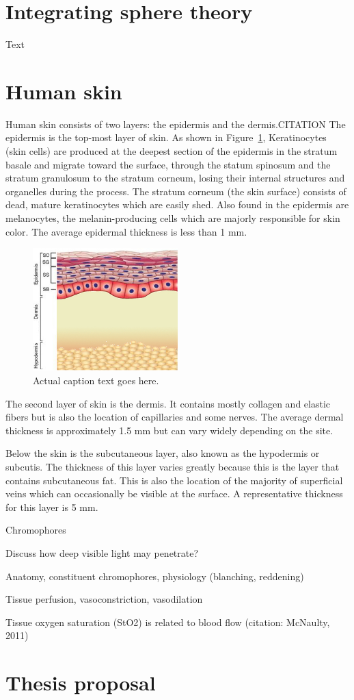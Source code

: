 \section{Integrating sphere theory}
\label{sec:is_theory}
Text

\section{Human skin}
Human skin consists of two layers: the epidermis and the dermis.CITATION The epidermis is the top-most layer of skin. As shown in Figure~\ref{fig:intro-skin_layers}, Keratinocytes (skin cells) are produced at the deepest section of the epidermis in the stratum basale and migrate toward the surface, through the statum spinosum and the stratum granulosum to the stratum corneum, losing their internal structures and organelles during the process. The stratum corneum (the skin surface) consists of dead, mature keratinocytes which are easily shed. Also found in the epidermis are melanocytes, the melanin-producing cells which are majorly responsible for skin color. The average epidermal thickness is less than 1 mm.\cite{Huclova2012}

\begin{figure}
	\centering \includegraphics[width=0.5\textwidth]{figures/intro-skin_layers.jpg}
	\caption[Hover text]{\label{fig:intro-skin_layers}Actual caption text goes here.}
\end{figure}

The second layer of skin is the dermis. It contains mostly collagen and elastic fibers but is also the location of capillaries and some nerves. The average dermal thickness is approximately 1.5 mm but can vary widely depending on the site.

Below the skin is the subcutaneous layer, also known as the hypodermis or subcutis. The thickness of this layer varies greatly because this is the layer that contains subcutaneous fat. This is also the location of the majority of superficial veins which can occasionally be visible at the surface. A representative thickness for this layer is 5 mm.

Chromophores

Discuss how deep visible light may penetrate?

Anatomy, constituent chromophores, physiology (blanching, reddening)

Tissue perfusion, vasoconstriction, vasodilation

Tissue oxygen saturation (StO2) is related to blood flow (citation: McNaulty, 2011)

\section{Thesis proposal}